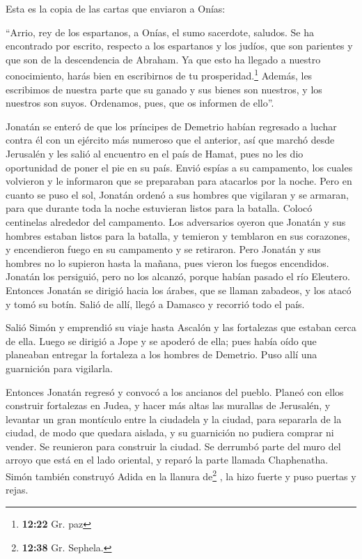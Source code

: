  Esta es la copia de las cartas que enviaron a Onías:

 ``Arrio, rey de los espartanos, a Onías, el sumo
sacerdote, saludos.  Se ha encontrado por escrito,
respecto a los espartanos y los judíos, que son parientes y que son de
la descendencia de Abraham.  Ya que esto ha llegado a
nuestro conocimiento, harás bien en escribirnos de tu
prosperidad.\footnote{\textbf{12:22} Gr. paz}  Además,
les escribimos de nuestra parte que su ganado y sus bienes son nuestros,
y los nuestros son suyos. Ordenamos, pues, que os informen de ello''.

 Jonatán se enteró de que los príncipes de Demetrio
habían regresado a luchar contra él con un ejército más numeroso que el
anterior,  así que marchó desde Jerusalén y les salió al
encuentro en el país de Hamat, pues no les dio oportunidad de poner el
pie en su país.  Envió espías a su campamento, los cuales
volvieron y le informaron que se preparaban para atacarlos por la noche.
 Pero en cuanto se puso el sol, Jonatán ordenó a sus
hombres que vigilaran y se armaran, para que durante toda la noche
estuvieran listos para la batalla. Colocó centinelas alrededor del
campamento.  Los adversarios oyeron que Jonatán y sus
hombres estaban listos para la batalla, y temieron y temblaron en sus
corazones, y encendieron fuego en su campamento y se retiraron.
 Pero Jonatán y sus hombres no lo supieron hasta la
mañana, pues vieron los fuegos encendidos.  Jonatán los
persiguió, pero no los alcanzó, porque habían pasado el río Eleutero.
 Entonces Jonatán se dirigió hacia los árabes, que se
llaman zabadeos, y los atacó y tomó su botín.  Salió de
allí, llegó a Damasco y recorrió todo el país.

 Salió Simón y emprendió su viaje hasta Ascalón y las
fortalezas que estaban cerca de ella. Luego se dirigió a Jope y se
apoderó de ella;  pues había oído que planeaban entregar
la fortaleza a los hombres de Demetrio. Puso allí una guarnición para
vigilarla.

 Entonces Jonatán regresó y convocó a los ancianos del
pueblo. Planeó con ellos construir fortalezas en Judea, 
y hacer más altas las murallas de Jerusalén, y levantar un gran
montículo entre la ciudadela y la ciudad, para separarla de la ciudad,
de modo que quedara aislada, y su guarnición no pudiera comprar ni
vender.  Se reunieron para construir la ciudad. Se
derrumbó parte del muro del arroyo que está en el lado oriental, y
reparó la parte llamada Chaphenatha.  Simón también
construyó Adida en la llanura de\footnote{\textbf{12:38} Gr. Sephela.} ,
la hizo fuerte y puso puertas y rejas.

